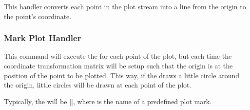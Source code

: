 \begin{command}{\pgfplothandlerpolarcomb}
  This handler converts each point in the plot stream into a line from
  the origin to the point's coordinate.
  
\begin{codeexample}[]
\end{codeexample}
\end{command}

\subsubsection{Mark Plot Handler}

\label{section-plot-marks}

\begin{command}{\pgfplothandlermark{}}
  This command will execute the  for each point of the
  plot, but each time the coordinate transformation matrix will be
  setup such that the origin is at the position of the point to be
  plotted. This way, if the  draws a little circle
  around the origin, little circles will be drawn at each point of the
  plot.
  
\begin{codeexample}[]
\end{codeexample}

  Typically, the  will be ||, where  is the name of a
  predefined plot mark.
\end{command}

